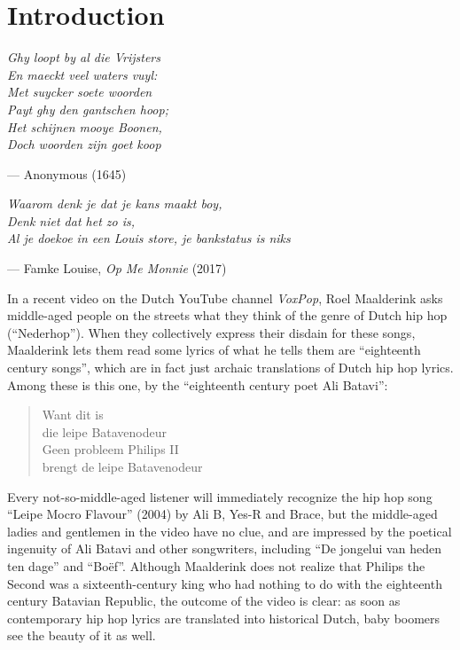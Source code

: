 \chapter{Introduction}

\epigraph{\textit{Ghy loopt by al die Vrijsters\\
	En maeckt veel waters vuyl:\\
	Met suycker soete woorden\\
	Payt ghy den gantschen hoop;\\
	Het schijnen mooye Boonen,\\
	Doch woorden zijn goet koop}}{--- Anonymous (1645)}

\epigraph{\textit{Waarom denk je dat je kans maakt boy,\\
		Denk niet dat het zo is,\\
		Al je doekoe in een Louis store, je bankstatus is niks}}{--- Famke Louise, \textit{Op Me Monnie} (2017)}

\noindent In a recent video on the Dutch YouTube channel \textit{VoxPop}, Roel Maalderink asks middle-aged people on the streets what they think of the genre of Dutch hip hop (\enquote{Nederhop}). When they collectively express their disdain for these songs, Maalderink lets them read some lyrics of what he tells them are \enquote{eighteenth century songs}, which are in fact just archaic translations of Dutch hip hop lyrics. Among these is this one, by the \enquote{eighteenth century poet Ali Batavi}:

\begin{quote}
	Want dit is\\
	die leipe Batavenodeur\\
	Geen probleem Philips II \\
	brengt de leipe Batavenodeur
\end{quote}

\noindent Every not-so-middle-aged listener will immediately recognize the hip hop song \enquote{Leipe Mocro Flavour} (2004) by Ali B, Yes-R and Brace, but the middle-aged ladies and gentlemen in the video have no clue, and are impressed by the poetical ingenuity of Ali Batavi and other songwriters, including \enquote{De jongelui van heden ten dage} and \enquote{Boëf}. Although Maalderink does not realize that Philips the Second was a sixteenth-century king who had nothing to do with the eighteenth century Batavian Republic, the outcome of the video is clear: as soon as contemporary hip hop lyrics are translated into historical Dutch, baby boomers see the beauty of it as well.


